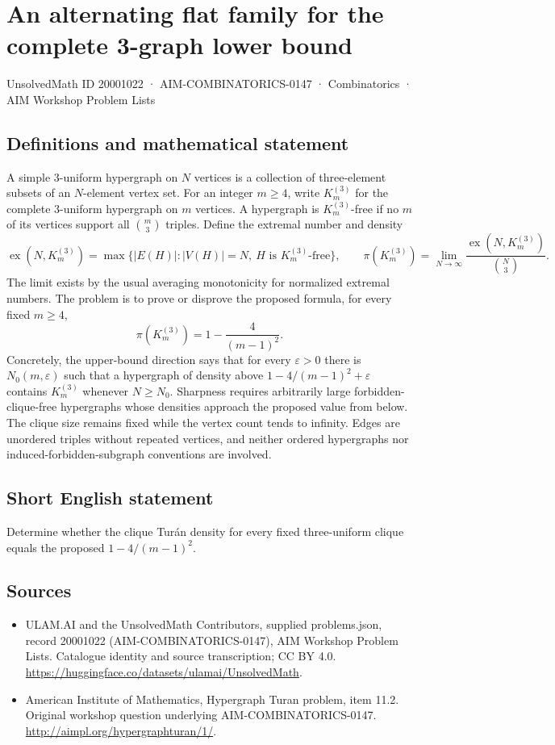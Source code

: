 \documentclass[11pt,a4paper]{article}
\begin{document}
\section*{An alternating flat family for the complete 3-graph lower bound}\label{20001022}
{\small UnsolvedMath ID 20001022 · AIM-COMBINATORICS-0147 · Combinatorics · AIM Workshop Problem Lists}
\subsection{Definitions and mathematical statement}
A simple $3$-uniform hypergraph on $N$ vertices is a collection of three-element subsets of an $N$-element vertex set.
For an integer $m\geq4$, write $K_m^{(3)}$ for the complete $3$-uniform hypergraph on $m$ vertices.
A hypergraph is $K_m^{(3)}$-free if no $m$ of its vertices support all $\binom m3$ triples.
Define the extremal number and density
\[
 \operatorname{ex}(N,K_m^{(3)})
   =\max\{|E(H)|:|V(H)|=N,\ H\text{ is }K_m^{(3)}\text{-free}\},
 \qquad
 \pi(K_m^{(3)})=\lim_{N\to\infty}
       \frac{\operatorname{ex}(N,K_m^{(3)})}{\binom N3}.
\]
The limit exists by the usual averaging monotonicity for normalized extremal numbers.
The problem is to prove or disprove the proposed formula, for every fixed $m\geq4$,
\[
 \pi(K_m^{(3)})=1-\frac{4}{(m-1)^2}.
\]
Concretely, the upper-bound direction says that for every $\varepsilon>0$ there is $N_0(m,\varepsilon)$ such that a hypergraph of density above $1-4/(m-1)^2+\varepsilon$ contains $K_m^{(3)}$ whenever $N\geq N_0$.
Sharpness requires arbitrarily large forbidden-clique-free hypergraphs whose densities approach the proposed value from below.
The clique size remains fixed while the vertex count tends to infinity.
Edges are unordered triples without repeated vertices, and neither ordered hypergraphs nor induced-forbidden-subgraph conventions are involved.
\subsection{Short English statement}
Determine whether the clique Turán density for every fixed three-uniform clique equals the proposed $1-4/(m-1)^2$.
\subsection{Sources}
\begin{itemize}
\item[S1] ULAM.AI and the UnsolvedMath Contributors, supplied problems.json, record 20001022 (AIM-COMBINATORICS-0147), AIM Workshop Problem Lists. Catalogue identity and source transcription; CC BY 4.0.
\url{https://huggingface.co/datasets/ulamai/UnsolvedMath}.
\item[S2] American Institute of Mathematics, Hypergraph Turan problem, item 11.2. Original workshop question underlying AIM-COMBINATORICS-0147.
\url{http://aimpl.org/hypergraphturan/1/}.
\end{itemize}
\end{document}
